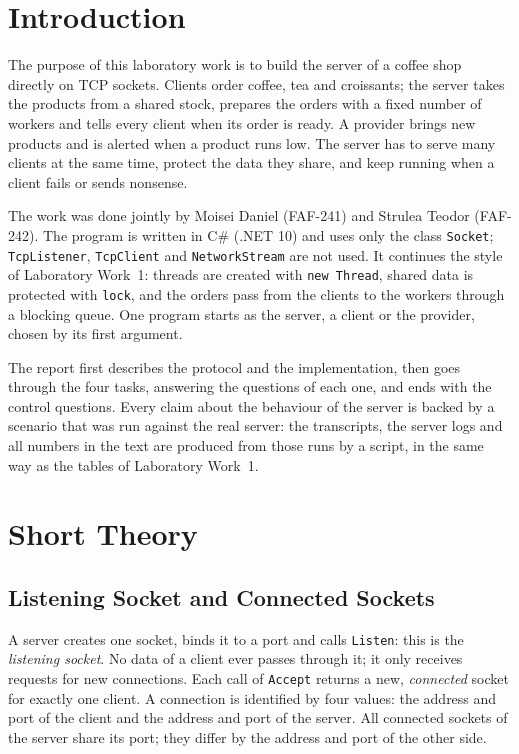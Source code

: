 \documentclass[12pt,a4paper]{article}
\begin{document}
\setcounter{page}{2}
\tableofcontents
\newpage

\section*{Introduction}

The purpose of this laboratory work is to build the server of a coffee shop directly on TCP sockets. Clients order coffee, tea and croissants; the server takes the products from a shared stock, prepares the orders with a fixed number of workers and tells every client when its order is ready. A provider brings new products and is alerted when a product runs low. The server has to serve many clients at the same time, protect the data they share, and keep running when a client fails or sends nonsense.

The work was done jointly by Moisei Daniel (FAF-241) and Strulea Teodor (FAF-242). The program is written in C\# (.NET 10) and uses only the class \texttt{Socket}; \texttt{TcpListener}, \texttt{TcpClient} and \texttt{NetworkStream} are not used. It continues the style of Laboratory Work~1: threads are created with \texttt{new Thread}, shared data is protected with \texttt{lock}, and the orders pass from the clients to the workers through a blocking queue. One program starts as the server, a client or the provider, chosen by its first argument.

The report first describes the protocol and the implementation, then goes through the four tasks, answering the questions of each one, and ends with the control questions. Every claim about the behaviour of the server is backed by a scenario that was run against the real server: the transcripts, the server logs and all numbers in the text are produced from those runs by a script, in the same way as the tables of Laboratory Work~1.

\newpage
\section{Short Theory}

\subsection{Listening Socket and Connected Sockets}

A server creates one socket, binds it to a port and calls \texttt{Listen}: this is the \textit{listening socket}. No data of a client ever passes through it; it only receives requests for new connections. Each call of \texttt{Accept} returns a new, \textit{connected} socket for exactly one client. A connection is identified by four values: the address and port of the client and the address and port of the server. All connected sockets of the server share its port; they differ by the address and port of the other side.
\end{document}
